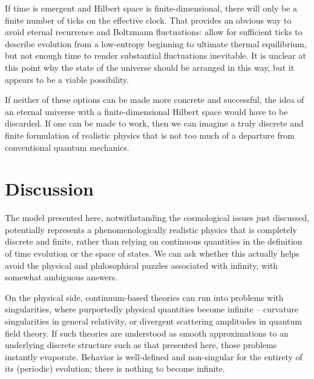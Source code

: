\documentclass[aps,prd,nofootinbib,notitlepage,12pt]{revtex4-2}
\begin{document}
If time is emergent and Hilbert space is finite-dimensional, there will only be a finite number of ticks on the effective clock.
That provides an obvious way to avoid eternal recurrence and Boltzmann fluctuations: allow for sufficient ticks to describe evolution from a low-entropy beginning to ultimate thermal equilibrium, but not enough time to render substantial fluctuations inevitable.
It is unclear at this point why the state of the universe should be arranged in this way, but it appears to be a viable possibility.

If neither of these options can be made more concrete and successful, the idea of an eternal universe with a finite-dimensional Hilbert space would have to be discarded.
If one can be made to work, then we can imagine a truly discrete and finite formulation of realistic physics that is not too much of a departure from conventional quantum mechanics.

\section{Discussion}

The model presented here, notwithstanding the cosmological issues just discussed, potentially represents a phenomenologically realistic physics that is completely discrete and finite, rather than relying on continuous quantities in the definition of time evolution or the space of states.
We can ask whether this actually helps avoid the physical and philosophical puzzles associated with infinity, with somewhat ambiguous answers.

On the physical side, continuum-based theories can run into problems with singularities, where purportedly physical quantities become infinite -- curvature singularities in general relativity, or divergent scattering amplitudes in quantum field theory.
If such theories are understood as smooth approximations to an underlying discrete structure such as that presented here, those problems instantly evaporate.
Behavior is well-defined and non-singular for the entirety of its (periodic) evolution; there is nothing to become infinite.
\end{document}
